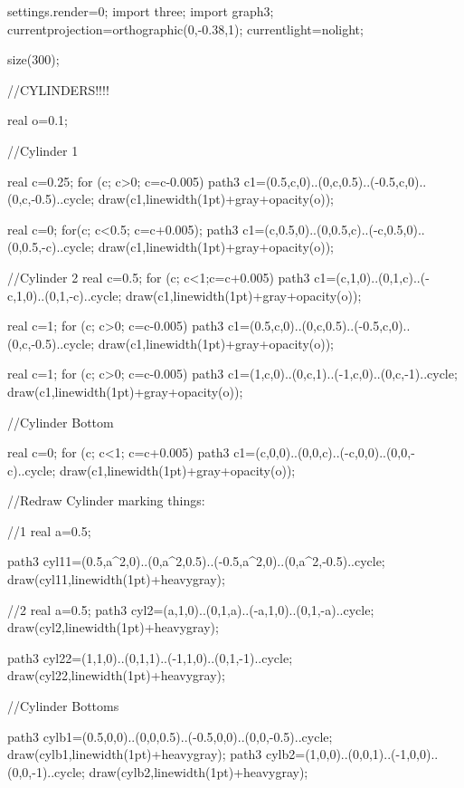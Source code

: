 
  	settings.render=0;
	import three;
    import graph3;
    currentprojection=orthographic(0,-0.38,1);
    currentlight=nolight;

	size(300);
    
    
    //CYLINDERS!!!!
    
    real o=0.1;
    
    //Cylinder 1
        
   	real c=0.25;
    for (c; c>0; c=c-0.005)
    {
        path3 c1=(0.5,c,0)..(0,c,0.5)..(-0.5,c,0)..(0,c,-0.5)..cycle;
    	draw(c1,linewidth(1pt)+gray+opacity(o));
    }
    
    real c=0;
    for(c; c<0.5; c=c+0.005);
    	{
    		path3 c1=(c,0.5,0)..(0,0.5,c)..(-c,0.5,0)..(0,0.5,-c)..cycle;
    		draw(c1,linewidth(1pt)+gray+opacity(o));
    	}
        
        
     //Cylinder 2
    real c=0.5;
    for (c; c<1;c=c+0.005)
    {
        path3 c1=(c,1,0)..(0,1,c)..(-c,1,0)..(0,1,-c)..cycle;
    	draw(c1,linewidth(1pt)+gray+opacity(o));
    }
        
   	real c=1;
    for (c; c>0; c=c-0.005)
    {
        path3 c1=(0.5,c,0)..(0,c,0.5)..(-0.5,c,0)..(0,c,-0.5)..cycle;
    	draw(c1,linewidth(1pt)+gray+opacity(o));
    }
    	
    real c=1;
    for (c; c>0; c=c-0.005)
    {
        path3 c1=(1,c,0)..(0,c,1)..(-1,c,0)..(0,c,-1)..cycle;
    	draw(c1,linewidth(1pt)+gray+opacity(o));
    }
        

   
   //Cylinder Bottom
    
    real c=0;
    for (c; c<1; c=c+0.005)
    {
        path3 c1=(c,0,0)..(0,0,c)..(-c,0,0)..(0,0,-c)..cycle;
    	draw(c1,linewidth(1pt)+gray+opacity(o));
    }
    
	//Redraw Cylinder marking things:
	
	//1
	real a=0.5;
    	
    path3 cyl11=(0.5,a^2,0)..(0,a^2,0.5)..(-0.5,a^2,0)..(0,a^2,-0.5)..cycle;
    	draw(cyl11,linewidth(1pt)+heavygray);
    
    //2	
   	real a=0.5;
		path3 cyl2=(a,1,0)..(0,1,a)..(-a,1,0)..(0,1,-a)..cycle;
    	draw(cyl2,linewidth(1pt)+heavygray);
    	
    path3 cyl22=(1,1,0)..(0,1,1)..(-1,1,0)..(0,1,-1)..cycle;
    	draw(cyl22,linewidth(1pt)+heavygray);
    	
    	
	//Cylinder Bottoms
    	
    path3 cylb1=(0.5,0,0)..(0,0,0.5)..(-0.5,0,0)..(0,0,-0.5)..cycle;
    	draw(cylb1,linewidth(1pt)+heavygray);	
    path3 cylb2=(1,0,0)..(0,0,1)..(-1,0,0)..(0,0,-1)..cycle;
    	draw(cylb2,linewidth(1pt)+heavygray);

